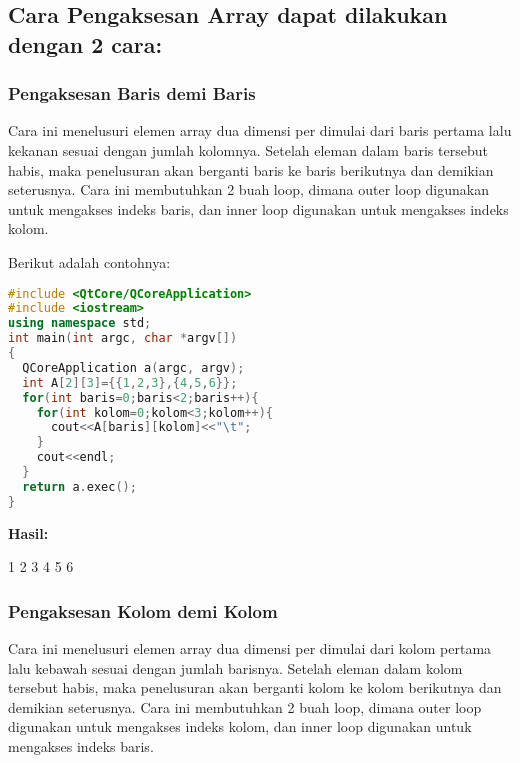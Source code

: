 \subsection{Cara Pengaksesan Array dapat dilakukan dengan 2
cara:}\label{cara-pengaksesan-array-dapat-dilakukan-dengan-2-cara}

\subsubsection{Pengaksesan Baris demi Baris}\label{pengaksesan-baris-demi-baris}

Cara ini menelusuri elemen array dua dimensi per dimulai dari baris
pertama lalu kekanan sesuai dengan jumlah kolomnya. Setelah eleman dalam
baris tersebut habis, maka penelusuran akan berganti baris ke baris
berikutnya dan demikian seterusnya. Cara ini membutuhkan 2 buah loop,
dimana outer loop digunakan untuk mengakses indeks baris, dan inner loop
digunakan untuk mengakses indeks kolom.

Berikut adalah contohnya:

\begin{lstlisting}[language=c++, caption=Pengaksesan Baris demi Baris, label=contoh3-12]
#include <QtCore/QCoreApplication>
#include <iostream>
using namespace std;
int main(int argc, char *argv[])
{
  QCoreApplication a(argc, argv);
  int A[2][3]={{1,2,3},{4,5,6}};
  for(int baris=0;baris<2;baris++){
    for(int kolom=0;kolom<3;kolom++){
      cout<<A[baris][kolom]<<"\t";
    }
    cout<<endl;
  }
  return a.exec();
}
\end{lstlisting}

\textbf{Hasil:}

\begin{lcverbatim}
1	 2 	3
4 	5 	6
\end{lcverbatim}

\subsubsection{Pengaksesan Kolom demi Kolom}\label{pengaksesan-kolom-demi-kolom}

Cara ini menelusuri elemen array dua dimensi per dimulai dari kolom
pertama lalu kebawah sesuai dengan jumlah barisnya. Setelah eleman dalam
kolom tersebut habis, maka penelusuran akan berganti kolom ke kolom
berikutnya dan demikian seterusnya. Cara ini membutuhkan 2 buah loop,
dimana outer loop digunakan untuk mengakses indeks kolom, dan inner loop
digunakan untuk mengakses indeks baris.

